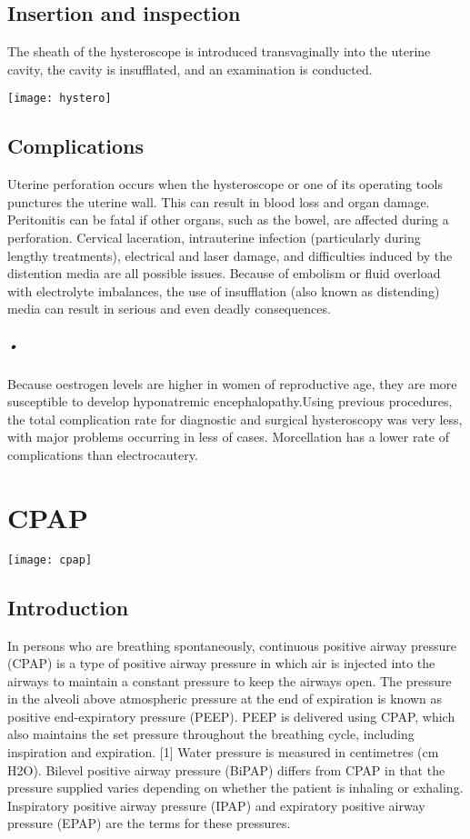 \documentclass[12pt]{article}
\begin{document}
\subsection{Insertion and inspection}

The sheath of the hysteroscope is introduced transvaginally into the uterine cavity, the cavity is insufflated, and an examination is conducted.

\texttt{[image: hystero]}

\subsection{Complications}
Uterine perforation occurs when the hysteroscope or one of its operating tools punctures the uterine wall. This can result in blood loss and organ damage. Peritonitis can be fatal if other organs, such as the bowel, are affected during a perforation. Cervical laceration, intrauterine infection (particularly during lengthy treatments), electrical and laser damage, and difficulties induced by the distention media are all possible issues.
Because of embolism or fluid overload with electrolyte imbalances, the use of insufflation (also known as distending) media can result in serious and even deadly consequences.

\subparagraph{•} Because oestrogen levels are higher in women of reproductive age, they are more susceptible to develop hyponatremic encephalopathy.Using previous procedures, the total complication rate for diagnostic and surgical hysteroscopy was very less, with major problems occurring in less  of cases.  Morcellation has a lower rate of complications  than electrocautery.

\clearpage


\section{CPAP}

\texttt{[image: cpap]}


\subsection{Introduction}

In persons who are breathing spontaneously, continuous positive airway pressure (CPAP) is a type of positive airway pressure in which air is injected into the airways to maintain a constant pressure to keep the airways open. The pressure in the alveoli above atmospheric pressure at the end of expiration is known as positive end-expiratory pressure (PEEP). PEEP is delivered using CPAP, which also maintains the set pressure throughout the breathing cycle, including inspiration and expiration. [1] Water pressure is measured in centimetres (cm H2O). Bilevel positive airway pressure (BiPAP) differs from CPAP in that the pressure supplied varies depending on whether the patient is inhaling or exhaling. Inspiratory positive airway pressure (IPAP) and expiratory positive airway pressure (EPAP) are the terms for these pressures.
\end{document}
